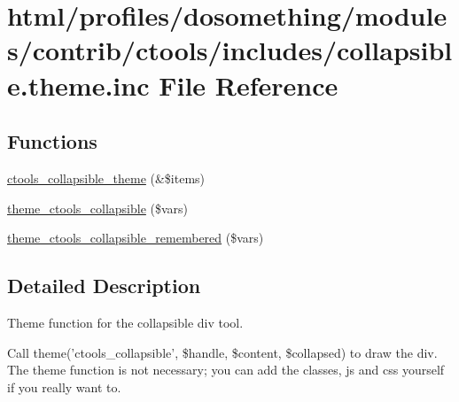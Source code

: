 \hypertarget{collapsible_8theme_8inc}{
\section{html/profiles/dosomething/modules/contrib/ctools/includes/collapsible.theme.inc File Reference}
\label{collapsible_8theme_8inc}
}
\subsection*{Functions}
\begin{DoxyCompactItemize}
\item 
\hyperlink{collapsible_8theme_8inc_ac3cbe28b20673b0c4763aa08fcb4cdb5}{ctools\_\-collapsible\_\-theme} (\&\$items)
\item 
\hyperlink{collapsible_8theme_8inc_ac2cacb7cc31343e4d0f076ccea68996f}{theme\_\-ctools\_\-collapsible} (\$vars)
\item 
\hyperlink{collapsible_8theme_8inc_af1a9535e3223701005bc7bbde65ba870}{theme\_\-ctools\_\-collapsible\_\-remembered} (\$vars)
\end{DoxyCompactItemize}


\subsection{Detailed Description}
Theme function for the collapsible div tool.

Call theme('ctools\_\-collapsible', \$handle, \$content, \$collapsed) to draw the div. The theme function is not necessary; you can add the classes, js and css yourself if you really want to. 

